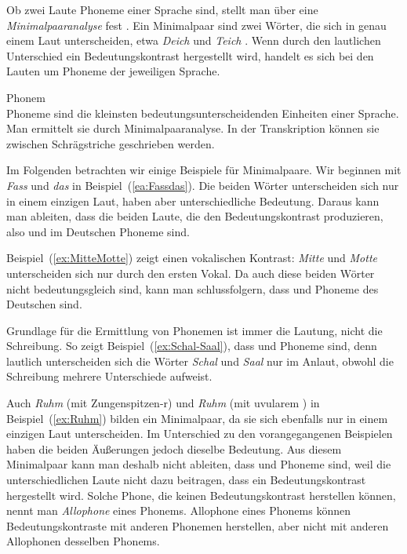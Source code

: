Ob zwei Laute Phoneme einer Sprache sind, stellt man über eine \textit{Minimalpaaranalyse} fest \citep[22--23]{Katamba1996}. Ein Minimalpaar sind zwei Wörter, die sich in genau einem Laut unterscheiden, etwa \textit{Deich} \textipa{[d\t*{aI}\c{c}]} und \textit{Teich} \textipa{[t\t*{aI}\c{c}]}. Wenn durch den lautlichen Unterschied ein Bedeutungskontrast hergestellt wird, handelt es sich bei den Lauten um Phoneme der jeweiligen Sprache.


\begin{Definition}{Phonem}\label{def:Phonem}\\
\noindent
Phoneme sind die kleinsten bedeutungsunterscheidenden Einheiten einer Sprache. Man ermittelt sie durch Minimalpaaranalyse. In der Transkription können sie zwischen Schrägstriche geschrieben werden. 

\end{Definition}

Im Folgenden betrachten wir einige Beispiele für Minimalpaare. Wir beginnen mit \textit{Fass} \textipa{[fas]} und \textit{das} \textipa{[das]} in Beispiel~(\ref{ea:Fassdas}). Die beiden Wörter unterscheiden sich nur in einem einzigen Laut, haben aber unterschiedliche Bedeutung. Daraus kann man ableiten, dass die beiden Laute, die den Bedeutungskontrast produzieren, also  und  im Deutschen Phoneme sind.

Beispiel~(\ref{ex:MitteMotte}) zeigt einen vokalischen Kontrast: \textit{Mitte} \textipa{[\textprimstress mI\.*t@]} und \textit{Motte} \textipa{[\textprimstress mO\.*t@]} unterscheiden sich nur durch den ersten Vokal. Da auch diese beiden Wörter nicht bedeutungsgleich sind, kann man schlussfolgern, dass  und  Phoneme des Deutschen sind.


Grundlage für die Ermittlung von Phonemen ist immer die Lautung, nicht die Schreibung. So zeigt Beispiel~(\ref{ex:Schal-Saal}), dass  und  Phoneme sind, denn lautlich unterscheiden sich die Wörter \textit{Schal} und \textit{Saal} nur im Anlaut, obwohl die Schreibung mehrere Unterschiede aufweist.

Auch \textit{Ruhm} \textipa{[ru:m]} (mit Zungenspitzen-r) und \textit{Ruhm} \textipa{[Ku:m]} (mit uvularem \textipa{[K]}) in Beispiel~(\ref{ex:Ruhm}) bilden ein Minimalpaar, da sie sich ebenfalls nur in einem einzigen Laut unterscheiden. Im Unterschied zu den vorangegangenen Beispielen haben die beiden Äußerungen jedoch dieselbe Bedeutung. 
Aus diesem Minimalpaar kann man deshalb nicht ableiten, dass \textipa{[r]} und \textipa{[K]} Phoneme sind, weil die unterschiedlichen Laute nicht dazu beitragen, dass ein Bedeutungskontrast hergestellt wird. Solche Phone, die keinen Bedeutungskontrast herstellen können, nennt man \textit{Allophone} eines Phonems. Allophone eines Phonems können Bedeutungskontraste mit anderen Phonemen herstellen, aber nicht mit anderen Allophonen desselben Phonems.



